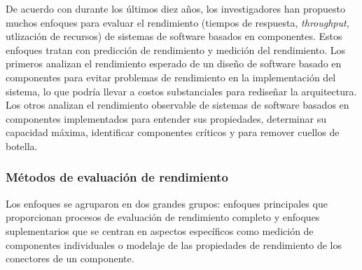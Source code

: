 \documentclass[11pt, twoside]{report}
\begin{document}
De acuerdo con \cite{performance-model-survey} durante los últimos diez años, los investigadores han propuesto muchos enfoques para evaluar el rendimiento (tiempos de respuesta, \emph{throughput}, utlización de recursos) de sistemas de software basados en componentes. Estos enfoques tratan con predicción de rendimiento y medición del rendimiento. Los primeros analizan el rendimiento esperado de un diseño de software basado en componentes para evitar problemas de rendimiento en la implementación del sistema, lo que podría llevar a costos substanciales para rediseñar la arquitectura. Los otros analizan el rendimiento observable de sistemas de software basados en componentes implementados para entender sus propiedades, determinar su capacidad máxima, identificar componentes críticos y para remover cuellos de botella.

\subsubsection{Métodos de evaluación de rendimiento}
Los enfoques se agruparon en dos grandes grupos: enfoques principales que proporcionan procesos de evaluación de rendimiento completo y enfoques suplementarios que se centran en aspectos específicos como medición de componentes individuales o modelaje de las propiedades de rendimiento de los conectores de un componente.
\end{document}
